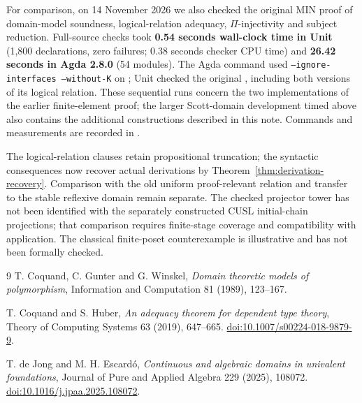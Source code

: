 \documentclass[11pt,a4paper]{article}
\theoremstyle{definition}
\theoremstyle{remark}
\begin{document}
For comparison, on 14 November 2026 we also checked the original MIN
proof of domain-model soundness, logical-relation adequacy,
$\Pi$-injectivity and subject reduction. Full-source checks took \textbf{0.54 seconds
wall-clock time in Unit} (1,800 declarations, zero failures; 0.38 seconds
checker CPU time) and \textbf{26.42 seconds in Agda 2.8.0} (54 modules).
The Agda command used \texttt{--ignore-interfaces --without-K} on
; Unit checked the original
, including both versions of its logical
relation. These sequential runs concern the two implementations of the
earlier finite-element proof; the larger Scott-domain development timed
above also contains the additional constructions described in this note.
Commands and measurements are recorded in .

The logical-relation clauses retain propositional truncation; the
syntactic consequences now recover actual derivations by
Theorem~\ref{thm:derivation-recovery}. Comparison with the old uniform
proof-relevant relation and transfer to the stable
reflexive domain remain separate. The checked projector tower has not
been identified with the separately constructed CUSL initial-chain
projections; that comparison requires finite-stage coverage and
compatibility with application. The classical finite-poset
counterexample is illustrative and has not been formally checked.

\begin{thebibliography}{9}
T. Coquand, C. Gunter and G. Winskel,
\emph{Domain theoretic models of polymorphism},
Information and Computation 81 (1989), 123--167.

T. Coquand and S. Huber,
\emph{An adequacy theorem for dependent type theory},
Theory of Computing Systems 63 (2019), 647--665.
\href{https://doi.org/10.1007/s00224-018-9879-9}{doi:10.1007/s00224-018-9879-9}.

T. de Jong and M. H. Escard\'o,
\emph{Continuous and algebraic domains in univalent foundations},
Journal of Pure and Applied Algebra 229 (2025), 108072.
\href{https://doi.org/10.1016/j.jpaa.2025.108072}{doi:10.1016/j.jpaa.2025.108072}.
\end{thebibliography}
\end{document}
